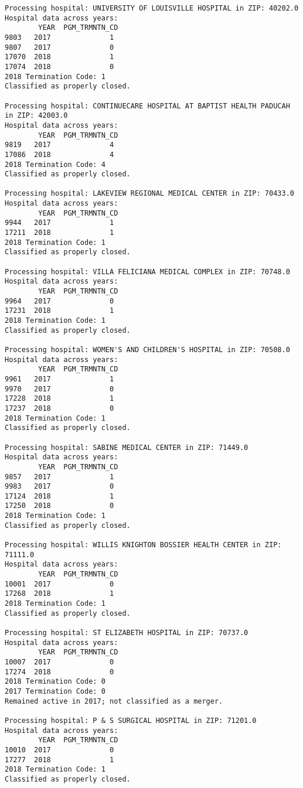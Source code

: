 \documentclass[
  letterpaper,
  DIV=11,
  numbers=noendperiod]{scrartcl}
\begin{document}
\begin{verbatim}
Processing hospital: UNIVERSITY OF LOUISVILLE HOSPITAL in ZIP: 40202.0
Hospital data across years:
        YEAR  PGM_TRMNTN_CD
9803   2017              1
9807   2017              0
17070  2018              1
17074  2018              0
2018 Termination Code: 1
Classified as properly closed.

Processing hospital: CONTINUECARE HOSPITAL AT BAPTIST HEALTH PADUCAH in ZIP: 42003.0
Hospital data across years:
        YEAR  PGM_TRMNTN_CD
9819   2017              4
17086  2018              4
2018 Termination Code: 4
Classified as properly closed.

Processing hospital: LAKEVIEW REGIONAL MEDICAL CENTER in ZIP: 70433.0
Hospital data across years:
        YEAR  PGM_TRMNTN_CD
9944   2017              1
17211  2018              1
2018 Termination Code: 1
Classified as properly closed.

Processing hospital: VILLA FELICIANA MEDICAL COMPLEX in ZIP: 70748.0
Hospital data across years:
        YEAR  PGM_TRMNTN_CD
9964   2017              0
17231  2018              1
2018 Termination Code: 1
Classified as properly closed.

Processing hospital: WOMEN'S AND CHILDREN'S HOSPITAL in ZIP: 70508.0
Hospital data across years:
        YEAR  PGM_TRMNTN_CD
9961   2017              1
9970   2017              0
17228  2018              1
17237  2018              0
2018 Termination Code: 1
Classified as properly closed.

Processing hospital: SABINE MEDICAL CENTER in ZIP: 71449.0
Hospital data across years:
        YEAR  PGM_TRMNTN_CD
9857   2017              1
9983   2017              0
17124  2018              1
17250  2018              0
2018 Termination Code: 1
Classified as properly closed.

Processing hospital: WILLIS KNIGHTON BOSSIER HEALTH CENTER in ZIP: 71111.0
Hospital data across years:
        YEAR  PGM_TRMNTN_CD
10001  2017              0
17268  2018              1
2018 Termination Code: 1
Classified as properly closed.

Processing hospital: ST ELIZABETH HOSPITAL in ZIP: 70737.0
Hospital data across years:
        YEAR  PGM_TRMNTN_CD
10007  2017              0
17274  2018              0
2018 Termination Code: 0
2017 Termination Code: 0
Remained active in 2017; not classified as a merger.

Processing hospital: P & S SURGICAL HOSPITAL in ZIP: 71201.0
Hospital data across years:
        YEAR  PGM_TRMNTN_CD
10010  2017              0
17277  2018              1
2018 Termination Code: 1
Classified as properly closed.


\end{verbatim}
\end{document}

